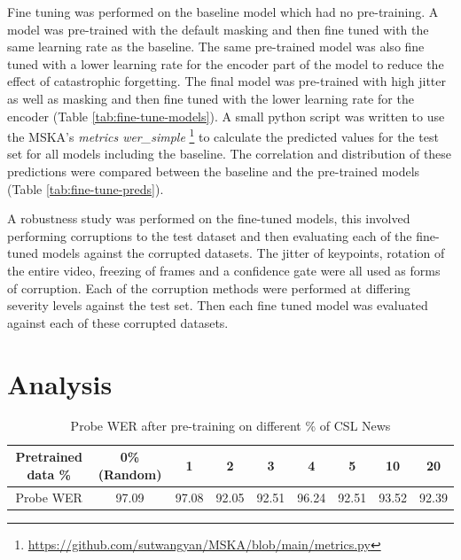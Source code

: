 \documentclass{article}
\begin{document}
Fine tuning was performed on the baseline model which had no pre-training. A model was pre-trained with the default masking and then fine tuned with the same learning rate as the baseline. The same pre-trained model was also fine tuned with a lower learning rate for the encoder part of the model to reduce the effect of catastrophic forgetting. The final model was pre-trained with high jitter as well as masking and then fine tuned with the lower learning rate for the encoder (Table \ref{tab:fine-tune-models}). A small python script was written to use the MSKA's \emph{metrics wer\_simple} \footnote{\url{https://github.com/sutwangyan/MSKA/blob/main/metrics.py}} to calculate the predicted values for the test set for all models including the baseline. The correlation and distribution of these predictions were compared between the baseline and the pre-trained models (Table \ref{tab:fine-tune-preds}). 


A robustness study was performed on the fine-tuned models, this involved performing corruptions to the test dataset and then evaluating each of the fine-tuned models against the corrupted datasets. The jitter of keypoints, rotation of the entire video, freezing of frames and a confidence gate were all used as forms of corruption. Each of the corruption methods were performed at differing severity levels against the test set. Then each fine tuned model was evaluated against each of these corrupted datasets. 

\newpage
\section{Analysis}
\begin{table}[htbp]
  \centering
  \label{tab:probe-percentage}
\begin{tabular}{|c|c|c|c|c|c|c|c|c|}
    \hline
      Pretrained data \% & 0\% (Random)  & 1 & 2 & 3 & 4 & 5 & 10 & 20  \\
    \hline
    \hline
    Probe WER & 97.09 & 97.08 & 92.05 & 92.51 & 96.24 & 92.51 & 93.52 & 92.39 \\
    \hline
  \end{tabular}
  \caption{Probe WER after pre-training on different \% of CSL News}
  \label{tab:probe-percent}
\end{table}
\end{document}
